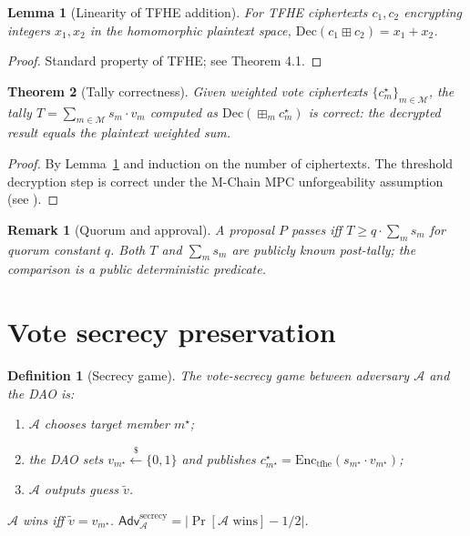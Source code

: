 \documentclass[11pt]{article}
\newtheorem{theorem}{Theorem}
\newtheorem{lemma}[theorem]{Lemma}
\newtheorem{definition}{Definition}
\newtheorem{remark}{Remark}
\begin{document}
\begin{lemma}[Linearity of TFHE addition]
\label{lem:linear}
For TFHE ciphertexts $c_1, c_2$ encrypting integers $x_1, x_2$ in
the homomorphic plaintext space,
$\mathrm{Dec}(c_1 \boxplus c_2) = x_1 + x_2$.
\end{lemma}

\begin{proof}
Standard property of TFHE; see \cite{tfhe} Theorem 4.1.
\end{proof}

\begin{theorem}[Tally correctness]
\label{thm:tally}
Given weighted vote ciphertexts
$\{c_m^\star\}_{m \in \mathcal{M}}$, the tally
$T = \sum_{m \in \mathcal{M}} s_m \cdot v_m$ computed as
$\mathrm{Dec}(\boxplus_m c_m^\star)$ is correct: the decrypted
result equals the plaintext weighted sum.
\end{theorem}

\begin{proof}
By Lemma~\ref{lem:linear} and induction on the number of
ciphertexts. The threshold decryption step is correct under the
M-Chain MPC unforgeability assumption (see \cite{cggmp21-lean,
frost-lean}).
\end{proof}

\begin{remark}[Quorum and approval]
A proposal $P$ passes iff $T \geq q \cdot \sum_m s_m$ for
quorum constant $q$. Both $T$ and $\sum_m s_m$ are publicly known
post-tally; the comparison is a public deterministic predicate.
\end{remark}

\section{Vote secrecy preservation}
\label{sec:secrecy}

\begin{definition}[Secrecy game]
\label{def:secrecy}
The vote-secrecy game between adversary $\mathcal{A}$ and the
DAO is:
\begin{enumerate}[nosep]
  \item $\mathcal{A}$ chooses target member $m^\star$;
  \item the DAO sets $v_{m^\star} \overset{\$}{\leftarrow} \{0,1\}$
        and publishes $c_{m^\star}^\star =
        \mathrm{Enc}_{\mathrm{tfhe}}(s_{m^\star} \cdot v_{m^\star})$;
  \item $\mathcal{A}$ outputs guess $\tilde{v}$.
\end{enumerate}
$\mathcal{A}$ wins iff $\tilde{v} = v_{m^\star}$.
$\mathsf{Adv}^{\mathrm{secrecy}}_{\mathcal{A}} =
|\Pr[\mathcal{A}\text{ wins}] - 1/2|$.
\end{definition}
\end{document}
